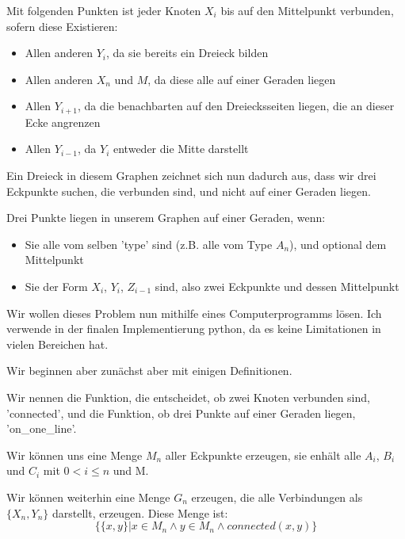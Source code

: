 \documentclass[11pt]{article}
\begin{document}
    Mit folgenden Punkten ist jeder Knoten $X_i$ bis auf den Mittelpunkt verbunden, sofern diese
    Existieren:

    \begin{itemize}
        \item Allen anderen $Y_i$, da sie bereits ein Dreieck bilden
        \item Allen anderen $X_n$ und $M$, da diese alle auf einer Geraden liegen
        \item Allen $Y_{i+1}$, da die benachbarten auf den Dreiecksseiten liegen, die an dieser Ecke angrenzen
        \item Allen $Y_{i-1}$, da $Y_i$ entweder die Mitte darstellt
    \end{itemize}

    \bigskip

    Ein Dreieck in diesem Graphen zeichnet sich nun dadurch aus, dass
    wir drei Eckpunkte suchen, die verbunden sind, und nicht auf einer Geraden liegen.

    Drei Punkte liegen in unserem Graphen auf einer Geraden, wenn:

    \begin{itemize}
        \item Sie alle vom selben 'type' sind (z.B. alle vom Type $A_n$), und optional dem Mittelpunkt
        \item Sie der Form $X_i$, $Y_i$, $Z_{i-1}$ sind, also zwei Eckpunkte und dessen Mittelpunkt
    \end{itemize}

    \newpage

    Wir wollen dieses Problem nun mithilfe eines Computerprogramms lösen.
    Ich verwende in der finalen Implementierung python, da es keine Limitationen in vielen Bereichen hat.

    Wir beginnen aber zunächst aber mit einigen Definitionen.

    Wir nennen die Funktion, die entscheidet, ob zwei Knoten verbunden sind, 'connected', und die Funktion,
    ob drei Punkte auf einer Geraden liegen, 'on\_one\_line'.

    Wir können uns eine Menge $M_n$ aller Eckpunkte erzeugen, sie enhält alle $A_i$, $B_i$ und $C_i$
    mit $0 < i \le n$ und M.

    Wir können weiterhin eine Menge $G_n$ erzeugen, die alle Verbindungen als $\{X_n, Y_n\}$ darstellt, erzeugen.
    Diese Menge ist:
    \[\{\{x, y\} \vert x \in M_n \land y \in M_n \land connected(x, y)\}\]
\end{document}
